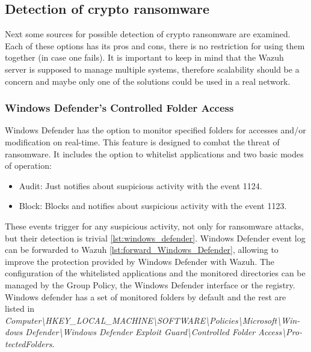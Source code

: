 \subsection{Detection of crypto ransomware}
Next some sources for possible detection of crypto ransomware are examined.
Each of these options has its pros and cons, there is no restriction for using them together (in case one fails).
It is important to keep in mind that the Wazuh server is supposed to manage multiple systems, therefore scalability should be a concern and maybe only one of the solutions could be used in a real network.

\subsubsection{Windows Defender's Controlled Folder Access}
Windows Defender has the option to monitor specified folders for accesses and/or modification on real-time.
This feature is designed to combat the threat of ransomware.
It includes the option to whitelist applications and two basic modes of operation\cite{hardening_windows_10}:
\begin{itemize}
	\item Audit: Just notifies about suspicious activity with the event 1124.
	\item Block: Blocks and notifies about suspicious activity with the event 1123.
\end{itemize}
\linej
These events trigger for any suspicious activity, not only for ransomware attacks, but their detection is trivial \ref{lst:windows_defender}.
Windows Defender event log can be forwarded to Wazuh \ref{lst:forward_Windows_Defender}, allowing to improve the protection provided by Windows Defender with Wazuh.
The configuration of the whitelisted applications and the monitored directories can be managed by the Group Policy, the Windows Defender interface or the registry.
\linej
Windows defender has a set of monitored folders by default and the rest are listed in \textit{Computer{\textbackslash}HKEY\_LOCAL\_MACHINE{\textbackslash}SOFTWARE{\textbackslash}Policies{\textbackslash}Microsoft{\textbackslash}Win- dows Defender{\textbackslash}Windows Defender Exploit Guard{\textbackslash}Controlled Folder Access{\textbackslash}Pro- tectedFolders}.

